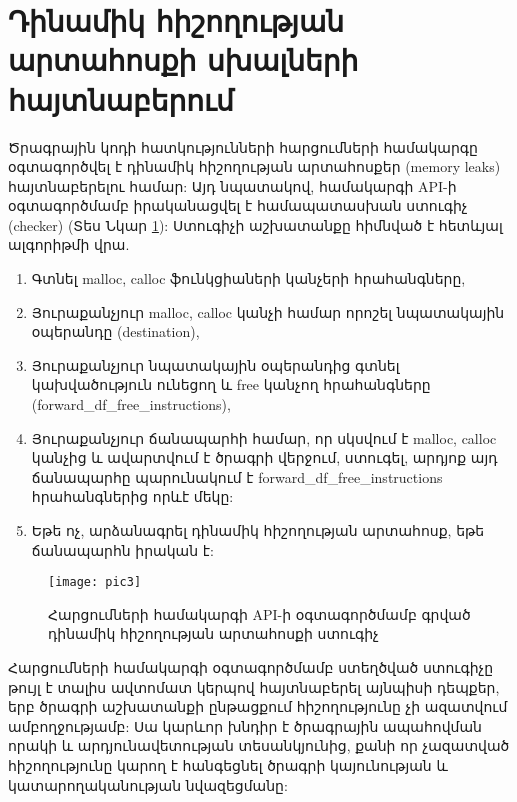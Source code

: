 \section{Դինամիկ հիշողության արտահոսքի սխալների հայտնաբերում}\label{sec:bugDetection}
Ծրագրային կոդի հատկությունների հարցումների համակարգը օգտագործվել է դինամիկ հիշողության
արտահոսքեր (memory leaks)\cite{MEMORYLEAK} հայտնաբերելու համար: Այդ նպատակով, համակարգի API-ի օգտագործմամբ
իրականացվել է համապատասխան ստուգիչ (checker) (Տես Նկար \ref{fig:figure3}): Ստուգիչի աշխատանքը հիմնված է հետևյալ ալգորիթմի վրա.
\begin{enumerate}
    \item Գտնել malloc, calloc ֆունկցիաների կանչերի հրահանգները,
    \item Յուրաքանչյուր malloc, calloc կանչի համար որոշել նպատակային օպերանդը (destination),
    \item Յուրաքանչյուր նպատակային օպերանդից գտնել կախվածություն ունեցող և free կանչող հրահանգները (forward\_df\_free\_instructions),
    \item Յուրաքանչյուր ճանապարհի համար, որ սկսվում է malloc, calloc կանչից և ավարտվում է ծրագրի վերջում, ստուգել,
    արդյոք այդ ճանապարհը պարունակում է forward\_df\_free\_instructions հրահանգներից որևէ մեկը:
    \item Եթե ոչ, արձանագրել դինամիկ հիշողության արտահոսք, եթե ճանապարհն իրական է:
\end{enumerate}

\begin{figure}[h]
    \centering
    \texttt{[image: pic3]}
    \caption{Հարցումների համակարգի API-ի օգտագործմամբ գրված դինամիկ հիշողության արտահոսքի ստուգիչ}
    \label{fig:figure3}
\end{figure}

Հարցումների համակարգի օգտագործմամբ ստեղծված ստուգիչը թույլ է տալիս ավտոմատ կերպով հայտնաբերել
այնպիսի դեպքեր, երբ ծրագրի աշխատանքի ընթացքում հիշողությունը չի ազատվում ամբողջությամբ: Սա կարևոր խնդիր է ծրագրային
ապահովման որակի և արդյունավետության տեսանկյունից, քանի որ չազատված հիշողությունը կարող է հանգեցնել ծրագրի
կայունության և կատարողականության նվազեցմանը:


